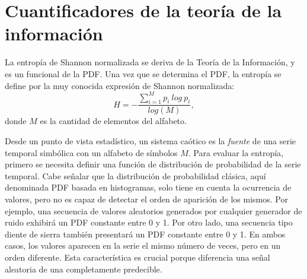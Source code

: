 \section{Cuantificadores de la teoría de la información}

La entropía de Shannon normalizada se deriva de la Teoría de la Información, y es un funcional de la PDF.
Una vez que se determina el PDF, la entropía se define por la muy conocida expresión de Shannon normalizada:
%
\begin{equation}
H=-\frac{\sum_{i=1}^{M}{p_i~log~p_i}}{log(M)}, \label{eq:shannon}
\end{equation}
%
donde $ M $ es la cantidad de elementos del alfabeto.

Desde un punto de vista estadístico, un sistema caótico es la \textit{fuente} de una serie temporal simbólica con un alfabeto de símbolos $M$.
Para evaluar la entropía, primero se necesita definir una función de distribución de probabilidad de la serie temporal.
Cabe señalar que la distribución de probabilidad clásica, aquí denominada PDF basada en histogramas, solo tiene en cuenta la ocurrencia de valores, pero no es capaz de detectar el orden de aparición de los mismos.
Por ejemplo, una secuencia de valores aleatorios generados por cualquier generador de ruido exhibirá un PDF constante entre 0 y 1.
Por otro lado, una secuencia tipo diente de sierra también presentará un PDF constante entre 0 y 1.
En ambos casos, los valores aparecen en la serie el mismo número de veces, pero en un orden diferente.
Esta característica es crucial porque diferencia una señal aleatoria de una completamente predecible.

